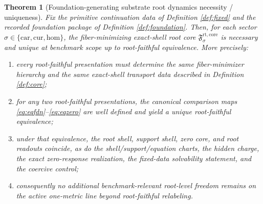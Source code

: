\documentclass[11pt]{article}
\newcommand{\Car}{\mathrm{car}}
\newcommand{\Cur}{\mathrm{cur}}
\newcommand{\Hom}{\mathrm{hom}}
\newcommand{\RootCore}[1]{\mathfrak F_{#1}^{\mathrm{rt,core}}}
\newtheorem{theorem}{Theorem}
\begin{document}
\begin{theorem}[Foundation-generating substrate root dynamics necessity / uniqueness]
\label{thm:main}
Fix the primitive continuation data of Definition \ref{def:fixed} and the recorded foundation package of Definition \ref{def:foundation}. Then, for each sector \(\sigma\in\{\Car,\Cur,\Hom\}\), the fiber-minimizing exact-shell root core \(\RootCore{\sigma}\) is necessary and unique at benchmark scope up to root-faithful equivalence. More precisely:
\begin{enumerate}
    \item every root-faithful presentation must determine the same fiber-minimizer hierarchy and the same exact-shell transport data described in Definition \ref{def:core};
    \item for any two root-faithful presentations, the canonical comparison maps \eqref{eq:eqfdn}--\eqref{eq:eqzero} are well defined and yield a unique root-faithful equivalence;
    \item under that equivalence, the root shell, support shell, zero core, and root readouts coincide, as do the shell/support/equation charts, the hidden charge, the exact zero-response realization, the fixed-data solvability statement, and the coercive control;
    \item consequently no additional benchmark-relevant root-level freedom remains on the active one-metric line beyond root-faithful relabeling.
\end{enumerate}
\end{theorem}
\end{document}
